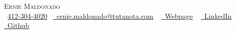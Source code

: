 	\begin{center}
	{\Huge \scshape Ernie Maldonado} \\ \vspace{5pt}
	\small \raisebox{-0.1\height}\faPhone\ \href{tel:14123044020}{412-304-4020}~ \href{mailto:ernie.maldonado@tutanota.com}{\raisebox{-0.2\height}\faEnvelope\  \underline{ernie.maldonado@tutanota.com}} ~
	\href{https://hernanmaldonado.github.io}{\raisebox{-0.2\height}\faGlobe\ \underline{Webpage}} ~
	\href{https://www.linkedin.com/in/erniemaldonado-excellence}{\raisebox{-0.2\height}\faLinkedin\ \underline{LinkedIn}}  ~
	\href{https://github.com/hernanmaldonado/}{\raisebox{-0.2\height}\faGithub\ \underline{Github}}
	\vspace{-8pt}
\end{center}